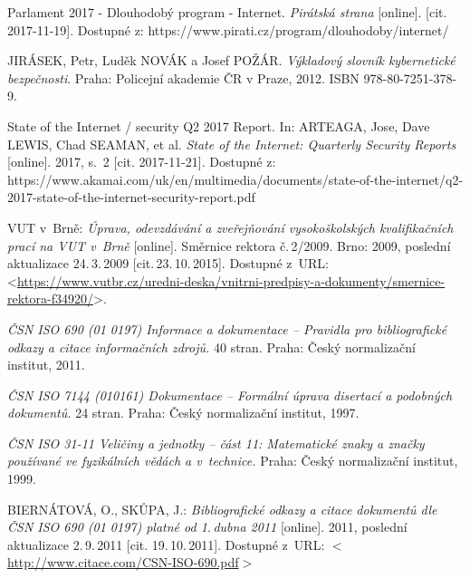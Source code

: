 

\begin{literatura}{99}

Parlament 2017 - Dlouhodobý program - Internet. \textit{Pirátská strana} [online]. [cit. 2017-11-19]. Dostupné z: https://www.pirati.cz/program/dlouhodoby/internet/

JIRÁSEK, Petr, Luděk NOVÁK a Josef POŽÁR. \textit{Výkladový slovník kybernetické bezpečnosti}. Praha: Policejní akademie ČR v Praze, 2012. ISBN 978-80-7251-378-9.

State of the Internet / security Q2 2017 Report. In: ARTEAGA, Jose, Dave LEWIS, Chad SEAMAN, et al. \textit{State of the Internet: Quarterly Security Reports} [online]. 2017, s.~2 [cit. 2017-11-21]. Dostupné z: https://www.akamai.com/uk/en/multimedia/documents/state-of-the-internet/q2-2017-state-of-the-internet-security-report.pdf
	
		VUT v~Brně:
    \emph{Úprava, odevzdávání a zveřejňování vysokoškolských kva\-li\-fi\-kač\-ních prací na VUT v~Brně}\/ [online].
		Směrnice rektora č.\,2/2009.
		Brno: 2009, po\-sled\-ní aktualizace 24.\,3.\,2009 [cit.\,23.\,10.\,2015].
    Dostupné z~URL:\\
    <\url{https://www.vutbr.cz/uredni-deska/vnitrni-predpisy-a-dokumenty/smernice-rektora-f34920/}>.

    \emph{ČSN ISO 690 (01 0197) Informace a dokumentace -- Pravidla pro bibliografické odkazy a citace informačních zdrojů.}
    40 stran. Praha: Český normalizační institut, 2011.

    \emph{ČSN ISO 7144 (010161) Dokumentace -- Formální úprava disertací a podobných dokumentů.}
    24 stran. Praha: Český normalizační institut, 1997.

    \emph{ČSN ISO 31-11 Veličiny a jednotky -- část 11: Matematické znaky a značky používané ve fyzikálních vědách a v~technice.}
    Praha: Český normalizační institut, 1999.

    BIERNÁTOVÁ, O., SKŮPA, J.:
    \emph{Bibliografické odkazy a citace dokumentů dle ČSN ISO 690 (01 0197) platné od 1.\,dubna 2011}\/ [online].
    2011, poslední aktualizace 2.\,9.\,2011 [cit. 19.\,10.\,2011].
    Dostupné z~URL:
    \(<\)\url{http://www.citace.com/CSN-ISO-690.pdf}\(>\)


\end{literatura}

